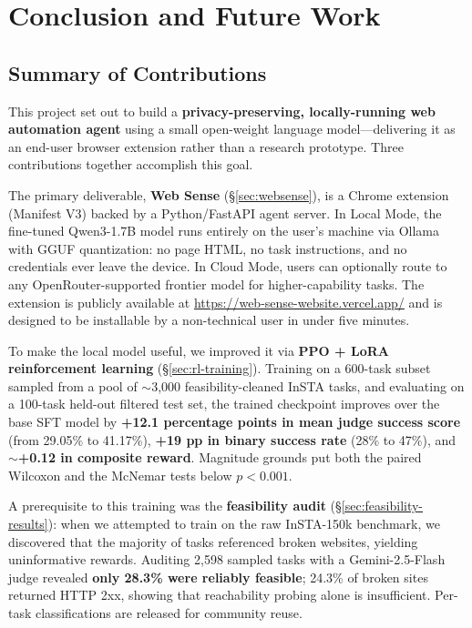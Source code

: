 \documentclass[12pt,a4paper]{report}
\begin{document}
\chapter{Conclusion and Future Work}\label{chap:conclusion}

\section{Summary of Contributions}

This project set out to build a \textbf{privacy-preserving, locally-running web automation agent} using a small open-weight language model---delivering it as an end-user browser extension rather than a research prototype. Three contributions together accomplish this goal.

The primary deliverable, \textbf{Web Sense} (\S\ref{sec:websense}), is a Chrome extension (Manifest V3) backed by a Python/FastAPI agent server. In Local Mode, the fine-tuned Qwen3-1.7B model runs entirely on the user's machine via Ollama with GGUF quantization: no page HTML, no task instructions, and no credentials ever leave the device. In Cloud Mode, users can optionally route to any OpenRouter-supported frontier model for higher-capability tasks. The extension is publicly available at \url{https://web-sense-website.vercel.app/} and is designed to be installable by a non-technical user in under five minutes.

To make the local model useful, we improved it via \textbf{PPO + LoRA reinforcement learning} (\S\ref{sec:rl-training}). Training on a 600-task subset sampled from a pool of $\sim$3{,}000 feasibility-cleaned InSTA tasks, and evaluating on a 100-task held-out filtered test set, the trained checkpoint improves over the base SFT model by \textbf{+12.1 percentage points in mean judge success score} (from 29.05\% to 41.17\%), \textbf{+19 pp in binary success rate} (28\% to 47\%), and \textbf{$\sim$+0.12 in composite reward}. Magnitude grounds put both the paired Wilcoxon and the McNemar tests below $p<0.001$.

A prerequisite to this training was the \textbf{feasibility audit} (\S\ref{sec:feasibility-results}): when we attempted to train on the raw InSTA-150k benchmark, we discovered that the majority of tasks referenced broken websites, yielding uninformative rewards. Auditing 2{,}598 sampled tasks with a Gemini-2.5-Flash judge revealed \textbf{only 28.3\% were reliably feasible}; 24.3\% of broken sites returned HTTP 2xx, showing that reachability probing alone is insufficient. Per-task classifications are released for community reuse.
\end{document}
